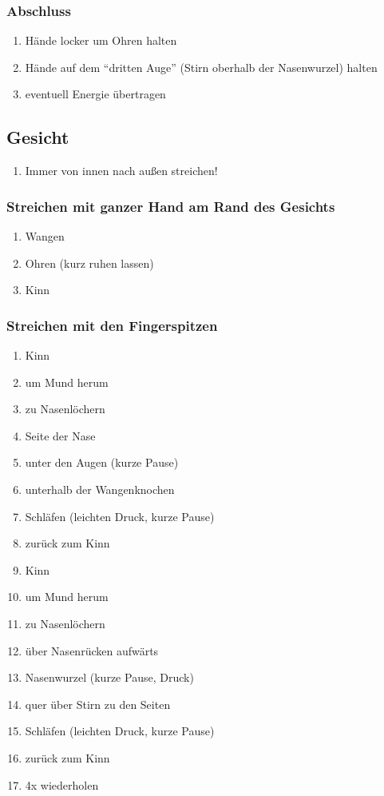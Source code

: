 \subsubsection{Abschluss}
\begin{enumerate}
\item Hände locker um Ohren halten
\item Hände auf dem "`dritten Auge"' (Stirn oberhalb der Nasenwurzel) halten
\item eventuell Energie übertragen
\end{enumerate}


\subsection{Gesicht}
\begin{enumerate}
\item Immer von innen nach außen streichen!
\end{enumerate}

\subsubsection{Streichen mit ganzer Hand am Rand des Gesichts}
\begin{enumerate}
\item Wangen
\item Ohren (kurz ruhen lassen)
\item Kinn
\end{enumerate}

\subsubsection{Streichen mit den Fingerspitzen}
\begin{enumerate}
\item Kinn
\item um Mund herum
\item zu Nasenlöchern
\item Seite der Nase
\item unter den Augen (kurze Pause)
\item unterhalb der Wangenknochen
\item Schläfen (leichten Druck, kurze Pause)
\item zurück zum Kinn
\item Kinn 
\item um Mund herum 
\item zu Nasenlöchern
\item über Nasenrücken aufwärts
\item Nasenwurzel (kurze Pause, Druck)
\item quer über Stirn zu den Seiten
\item Schläfen (leichten Druck, kurze Pause)
\item zurück zum Kinn
\item 4x wiederholen
\end{enumerate}

